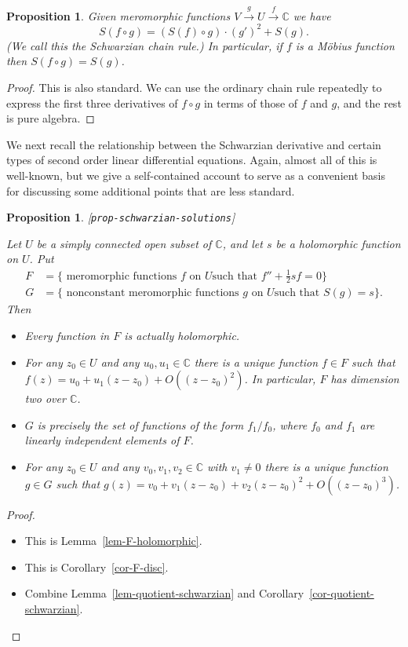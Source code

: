 \documentclass[reqno]{amsart}
\newcommand{\lbl}[1]{\label{#1}\textup{[\texttt{#1}]}\par}
\newcommand{\lbl}{\label}
\newcommand{\xra}       {\xrightarrow}
\newcommand{\C}         {{\mathbb{C}}}
\newcommand{\half}      {\tfrac{1}{2}}
\renewcommand{\:}{\colon}
\newtheorem{proposition}[theorem]{Proposition}
\theoremstyle{definition}
\begin{document}
\begin{proposition}
 Given meromorphic functions $V\xra{g}U\xra{f}\C$ we have
 \[ S(f\circ g) = (S(f)\circ g) \cdot (g')^2 + S(g). \]
 (We call this the \emph{Schwarzian chain rule}.)  In particular, if
 $f$ is a M\"obius function then $S(f\circ g)=S(g)$.
\end{proposition}
\begin{proof}
 This is also standard.  We can use the ordinary chain rule repeatedly to
 express the first three derivatives of $f\circ g$ in terms of those
 of $f$ and $g$, and the rest is pure algebra.
\end{proof}

We next recall the relationship between the Schwarzian derivative and
certain types of second order linear differential equations.  Again,
almost all of this is well-known, but we give a self-contained account
to serve as a convenient basis for discussing some additional points
that are less standard.

\begin{proposition}\lbl{prop-schwarzian-solutions}
 Let $U$ be a simply connected open subset of $\C$, and let $s$ be a
 holomorphic function on $U$.  Put
 \begin{align*}
  F &= \{ \text{ meromorphic functions $f$ on $U$
                  such that $f''+\half sf=0$} \} \\
  G &= \{ \text{ nonconstant meromorphic functions $g$ on $U$
                  such that $S(g)=s$} \}.
 \end{align*}
 Then
 \begin{itemize}
  \item[(a)] Every function in $F$ is actually holomorphic.
  \item[(b)] For any $z_0\in U$ and any $u_0,u_1\in\C$ there is a
   unique function $f\in F$ such that
   $f(z)=u_0+u_1(z-z_0)+O((z-z_0)^2)$.  In particular, $F$ has
   dimension two over $\C$.
  \item[(c)] $G$ is precisely the set of functions of the form
   $f_1/f_0$, where $f_0$ and $f_1$ are linearly independent elements
   of $F$.
  \item[(d)] For any $z_0\in U$ and any $v_0,v_1,v_2\in\C$ with
   $v_1\neq 0$ there is a unique function $g\in G$ such that
   $g(z)=v_0+v_1(z-z_0)+v_2(z-z_0)^2+O((z-z_0)^3)$.
 \end{itemize}
\end{proposition}
\begin{proof}
 \begin{itemize}
  \item[(a)] This is Lemma~\ref{lem-F-holomorphic}.
  \item[(b)] This is Corollary~\ref{cor-F-disc}.
  \item[(c)] Combine Lemma~\ref{lem-quotient-schwarzian} and
   Corollary~\ref{cor-quotient-schwarzian}.
 \end{itemize}
\end{proof}
\end{document}
